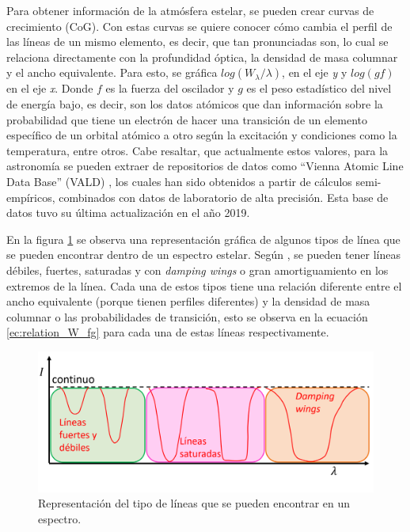 \documentclass[12pt,oneside,openany,letter]{book}
\begin{document}
\noindent Para obtener información de la atmósfera estelar, se pueden crear curvas de crecimiento (CoG). Con estas curvas se quiere conocer cómo cambia el perfil de las líneas de un mismo elemento, es decir, que tan pronunciadas son, lo cual se relaciona directamente con la profundidad óptica, la densidad de masa columnar y el ancho equivalente. Para esto, se gráfica $log(W_{\lambda}/\lambda)$, en el eje \textit{y} y $log(gf)$ en el eje \textit{x}. Donde $f$ es la fuerza del oscilador y $g$ es el peso estadístico del nivel de energía bajo, es decir, son los datos atómicos que dan información sobre la probabilidad que tiene un electrón de hacer una transición de un elemento específico de un orbital atómico a otro según la excitación y condiciones como la temperatura, entre otros. Cabe resaltar, que actualmente estos valores, para la astronomía se pueden extraer de repositorios de datos como ``Vienna Atomic Line Data Base'' (VALD) \citep{piskunov1995vald}, los cuales han sido obtenidos a partir de cálculos semi-empíricos, combinados con datos de laboratorio de alta precisión. Esta base de datos tuvo su última actualización en el año 2019.

En la figura \ref{fig:lines_cog} se observa una representación gráfica de algunos tipos de línea que se pueden encontrar dentro de un espectro estelar. Según \cite{carroll2017introduction}, se pueden tener líneas débiles, fuertes, saturadas y con \textit{damping wings} o gran amortiguamiento en los extremos de la línea. Cada una de estos tipos tiene una relación diferente entre el ancho equivalente (porque tienen perfiles diferentes) y la densidad de masa columnar o las probabilidades de transición, esto se observa en la ecuación \ref{ec:relation_W_fg} para cada una de estas líneas respectivamente.

\begin{figure}[h]
    \centering
    \includegraphics[width=0.9\linewidth]{Images/lineas_goc.png}
    \caption{Representación del tipo de líneas que se pueden encontrar en un espectro.}
    \label{fig:lines_cog}
\end{figure}
\end{document}
